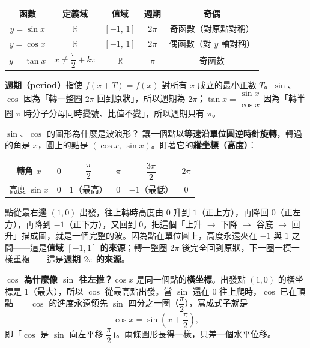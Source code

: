 \documentclass[11pt]{article}
\begin{document}
\begin{center}
\renewcommand{\arraystretch}{1.5}
\begin{tabular}{c|cccc}
\hline
函數 & 定義域 & 值域 & 週期 & 奇偶 \\
\hline
$y=\sin x$ & $\mathbb{R}$ & $[-1,\,1]$ & $2\pi$ & 奇函數（對原點對稱） \\
$y=\cos x$ & $\mathbb{R}$ & $[-1,\,1]$ & $2\pi$ & 偶函數（對 $y$ 軸對稱） \\
$y=\tan x$ & $x\neq\dfrac{\pi}{2}+k\pi$ & $\mathbb{R}$ & $\pi$ & 奇函數 \\
\hline
\end{tabular}
\end{center}

\textbf{週期（period）}指使 $f(x+T)=f(x)$ 對所有 $x$ 成立的最小正數 $T$。$\sin$、$\cos$ 因為「轉一整圈 $2\pi$ 回到原狀」，所以週期為 $2\pi$；$\tan x=\dfrac{\sin x}{\cos x}$ 因為「轉半圈 $\pi$ 時分子分母同時變號、比值不變」，所以週期只有 $\pi$。

\begin{補充框}{$\sin$、$\cos$ 的圖形為什麼是波浪形？}
讓一個點以\textbf{等速沿單位圓逆時針旋轉}，轉過的角是 $x$，圓上的點是 $(\cos x,\,\sin x)$。盯著它的\textbf{縱坐標（高度）}：

\begin{center}
\renewcommand{\arraystretch}{1.35}
\begin{tabular}{c|ccccc}
\hline
轉角 $x$ & $0$ & $\dfrac{\pi}{2}$ & $\pi$ & $\dfrac{3\pi}{2}$ & $2\pi$ \\
\hline
高度 $\sin x$ & $0$ & $1$（最高）& $0$ & $-1$（最低）& $0$ \\
\hline
\end{tabular}
\end{center}

點從最右邊 $(1,0)$ 出發，往上轉時高度由 $0$ 升到 $1$（正上方），再降回 $0$（正左方），再降到 $-1$（正下方），又回到 $0$。把這個「上升 $\rightarrow$ 下降 $\rightarrow$ 谷底 $\rightarrow$ 回升」描成圖，就是一個完整的波。因為點在單位圓上，高度永遠夾在 $-1$ 與 $1$ 之間——這是\textbf{值域 $[-1,1]$ 的來源}；轉一整圈 $2\pi$ 後完全回到原狀，下一圈一模一樣重複——這是\textbf{週期 $2\pi$ 的來源}。

\textbf{$\cos$ 為什麼像 $\sin$ 往左推？}$\cos x$ 是同一個點的\textbf{橫坐標}。出發點 $(1,0)$ 的橫坐標是 $1$（最大），所以 $\cos$ 從最高點出發。當 $\sin$ 還在 $0$ 往上爬時，$\cos$ 已在頂點——$\cos$ 的進度永遠領先 $\sin$ 四分之一圈（$\dfrac{\pi}{2}$），寫成式子就是
$$\cos x=\sin\!\left(x+\frac{\pi}{2}\right),$$
即「$\cos$ 是 $\sin$ 向左平移 $\dfrac{\pi}{2}$」。兩條圖形長得一樣，只差一個水平位移。
\end{補充框}
\end{document}
